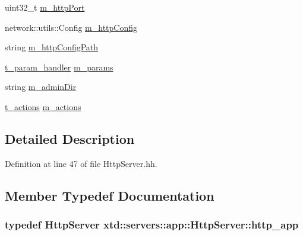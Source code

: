 \begin{DoxyCompactItemize}
uint32\+\_\+t \hyperlink{classxtd_1_1servers_1_1app_1_1HttpServer_a75ed3bcfa895cad365f6bf0955efcf9e}{m\+\_\+http\+Port}
\item 
network\+::utils\+::\+Config \hyperlink{classxtd_1_1servers_1_1app_1_1HttpServer_ad5f2480d758b731b641e4858f556a3c3}{m\+\_\+http\+Config}
\item 
string \hyperlink{classxtd_1_1servers_1_1app_1_1HttpServer_abfb9586e84fa5149da3226eeea39980f}{m\+\_\+http\+Config\+Path}
\item 
\hyperlink{classxtd_1_1servers_1_1app_1_1HttpServer_a9704ed4f011ec3a7424da2f2229477e1}{t\+\_\+param\+\_\+handler} \hyperlink{classxtd_1_1servers_1_1app_1_1HttpServer_ac4f9a2c40867f4f2ba8d30ec9876e51e}{m\+\_\+params}
\item 
string \hyperlink{classxtd_1_1servers_1_1app_1_1HttpServer_ad12543f950574ac8a0d813cb4ceeff4c}{m\+\_\+admin\+Dir}
\item 
\hyperlink{classxtd_1_1servers_1_1app_1_1HttpServer_ac61c9a29bf64b94cb8ca4c766f8309c3}{t\+\_\+actions} \hyperlink{classxtd_1_1servers_1_1app_1_1HttpServer_afa5363da18a3aa9de651e53e409116e9}{m\+\_\+actions}
\end{DoxyCompactItemize}


\subsection{Detailed Description}


Definition at line 47 of file Http\+Server.\+hh.



\subsection{Member Typedef Documentation}
\subsubsection[{\texorpdfstring{http\+\_\+app}{http_app}}]{\setlength{\rightskip}{0pt plus 5cm}typedef {\bf Http\+Server} {\bf xtd\+::servers\+::app\+::\+Http\+Server\+::http\+\_\+app}\hspace{0.3cm}{\ttfamily [protected]}}\hypertarget{classxtd_1_1servers_1_1app_1_1HttpServer_ad879d72fb0151a3c383ccbe75bb642cc}{}\label{classxtd_1_1servers_1_1app_1_1HttpServer_ad879d72fb0151a3c383ccbe75bb642cc}


